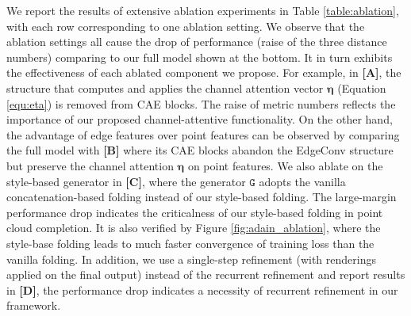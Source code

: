 \documentclass[final]{cvpr}
\begin{document}
We report the results of extensive ablation experiments in Table \ref{table:ablation}, with each row corresponding to one ablation setting. We observe that the ablation settings all cause the drop of performance (\ie raise of the three distance numbers) comparing to our full model shown at the bottom. It in turn exhibits the effectiveness of each ablated component we propose.
For example, in \textbf{[A]}, the structure that computes and applies the channel attention vector $\bm{\eta}$ (Equation \ref{equ:eta}) is removed from CAE blocks. The raise of metric numbers reflects the importance of our proposed channel-attentive functionality. 
On the other hand, the advantage of edge features over point features can be observed by comparing the full model with \textbf{[B]} where its CAE blocks abandon the EdgeConv structure but preserve the channel attention $\bm{\eta}$ on point features.
We also ablate on the style-based generator in \textbf{[C]}, where the generator $\mathtt{G}$ adopts the vanilla concatenation-based folding instead of our style-based folding. The large-margin performance drop indicates the criticalness of our style-based folding in point cloud completion. It is also verified by Figure \ref{fig:adain_ablation}, where the style-base folding leads to much faster convergence of training loss than the vanilla folding.
In addition, we use a single-step refinement (with renderings applied on the final output) instead of the recurrent refinement and report results in \textbf{[D]}, the performance drop indicates a necessity of recurrent refinement in our framework. 
\end{document}
